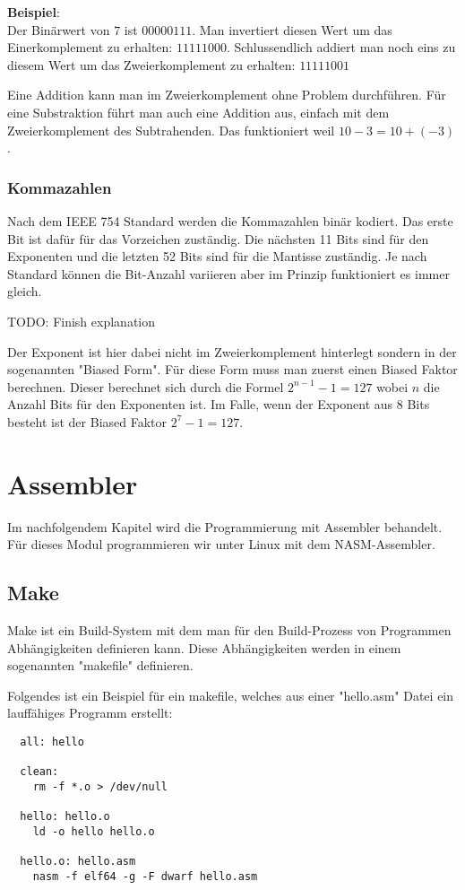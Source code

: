 \documentclass[12pt, a4paper, oneside]{article}
\begin{document}
{\bf Beispiel}:\\
Der Binärwert von $7$ ist $0000 0111$. Man invertiert diesen Wert um das Einerkomplement zu erhalten: $1111 1000$. Schlussendlich addiert man noch eins zu diesem Wert um das Zweierkomplement zu erhalten: $1111 1001$

Eine Addition kann man im Zweierkomplement ohne Problem durchführen. Für eine Substraktion führt man auch eine Addition aus, einfach mit dem Zweierkomplement des Subtrahenden. Das funktioniert weil $10 - 3 = 10 + (-3)$.

\subsubsection{Kommazahlen}
Nach dem IEEE 754 Standard werden die Kommazahlen binär kodiert. Das erste Bit ist dafür für das Vorzeichen zuständig. Die nächsten 11 Bits sind für den Exponenten und die letzten 52 Bits sind für die Mantisse zuständig. Je nach Standard können die Bit-Anzahl variieren aber im Prinzip funktioniert es immer gleich.

TODO: Finish explanation

Der Exponent ist hier dabei nicht im Zweierkomplement hinterlegt sondern in der sogenannten "Biased Form". Für diese Form muss man zuerst einen Biased Faktor berechnen. Dieser berechnet sich durch die Formel $2^{n-1}-1 = 127$ wobei $n$ die Anzahl Bits für den Exponenten ist. Im Falle, wenn der Exponent aus 8 Bits besteht ist der Biased Faktor $2^{7} -1 = 127$.

\newpage
\section{Assembler}
Im nachfolgendem Kapitel wird die Programmierung mit Assembler behandelt. Für dieses Modul programmieren wir unter Linux mit dem NASM-Assembler.

\subsection{Make}
Make ist ein Build-System mit dem man für den Build-Prozess von Programmen Abhängigkeiten definieren kann. Diese Abhängigkeiten werden in einem sogenannten "makefile" definieren.

Folgendes ist ein Beispiel für ein makefile, welches aus einer "hello.asm" Datei ein lauffähiges Programm erstellt:
\begin{verbatim} 
  all: hello
  
  clean:
    rm -f *.o > /dev/null
  
  hello: hello.o
    ld -o hello hello.o
  
  hello.o: hello.asm
    nasm -f elf64 -g -F dwarf hello.asm
\end{verbatim}
\end{document}
